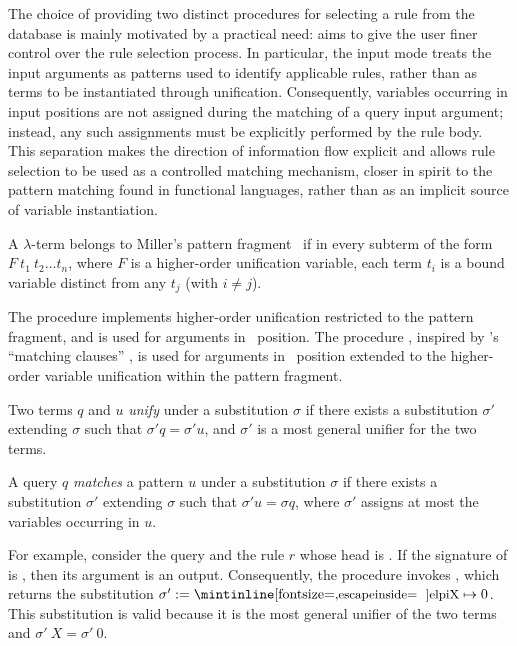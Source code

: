 The choice of providing two distinct procedures for selecting a rule from the
database is mainly motivated by a practical need: \elpi aims to give the user
finer control over the rule selection process. In particular, the input mode
treats the input arguments as patterns used to identify applicable rules, rather
than as terms to be instantiated through unification. Consequently, variables
occurring in input positions are not assigned during the matching of a query
input argument; instead, any such assignments must be explicitly performed by
the rule body. This separation makes the direction of information flow explicit
and allows rule selection to be used as a controlled matching mechanism, closer
in spirit to the pattern matching found in functional languages, rather than as
an implicit source of variable instantiation.

\begin{definition} \label{def:pattern-fragment}
  A $\lambda$-term belongs to Miller's pattern fragment~\cite{miller1991-pf} if in every subterm of
  the form $F\ t_1\ t_2 \dots t_n$, where $F$ is a higher-order unification
  variable, each term $t_i$ is a bound variable distinct from any $t_j$ (with $i
  \neq j$).
\end{definition}

The procedure \emph{\unify} implements higher-order unification restricted to the
pattern fragment, and is used for arguments in \Eoutput\ position. The
procedure \emph{\matching}, inspired by \bprolog's ``matching clauses''
\cite{zhou2012}, is used for arguments in \Einput\ position extended to the
higher-order variable unification within the pattern fragment.

\begin{definition}[\unify]\label{def:unify}
Two terms $q$ and $u$ \emph{unify} under a substitution $\sigma$ if there
exists a substitution $\sigma'$ extending $\sigma$ such that
$\sigma' q = \sigma' u$, and $\sigma'$ is a most general unifier for the two terms.
\end{definition}

\begin{definition}[\matching]\label{def:matching}
A query $q$ \emph{matches} a pattern $u$ under a substitution $\sigma$ if there
exists a substitution $\sigma'$ extending $\sigma$ such that
$\sigma' u = \sigma q$, where $\sigma'$ assigns at most the variables
occurring in $u$.
\end{definition}

For example, consider the query  and the rule $r$ whose head is . If the signature of  is , then its argument is an
output. Consequently, the procedure invokes ,
which returns the substitution $\sigma' := {\eI{X} \mapsto 0}$. This
substitution is valid because it is the most general unifier of the two terms
and $\sigma'\ X = \sigma'\ 0$.

